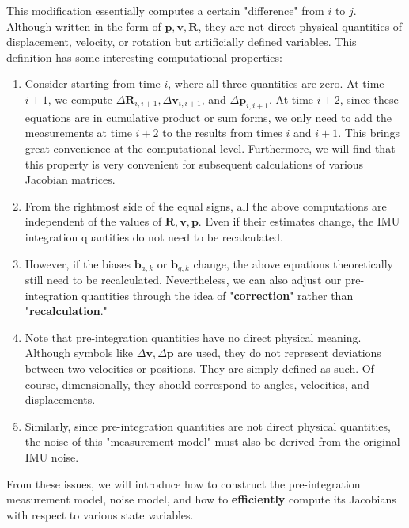 This modification essentially computes a certain "difference" from $i$ to $j$. Although written in the form of $\mathbf{p}, \mathbf{v}, \mathbf{R}$, they are not direct physical quantities of displacement, velocity, or rotation but artificially defined variables. This definition has some interesting computational properties:
\begin{enumerate}
	\item Consider starting from time $i$, where all three quantities are zero. At time $i+1$, we compute $\Delta \mathbf{R}_{i, i+1}, \Delta \mathbf{v}_{i, i+1}$, and $\Delta \mathbf{p}_{i,i+1}$. At time $i+2$, since these equations are in cumulative product or sum forms, we only need to add the measurements at time $i+2$ to the results from times $i$ and $i+1$. This brings great convenience at the computational level. Furthermore, we will find that this property is very convenient for subsequent calculations of various Jacobian matrices.
	\item From the rightmost side of the equal signs, all the above computations are independent of the values of $\mathbf{R}, \mathbf{v}, \mathbf{p}$. Even if their estimates change, the IMU integration quantities do not need to be recalculated.
	\item However, if the biases $\mathbf{b}_{a,k}$ or $\mathbf{b}_{g,k}$ change, the above equations theoretically still need to be recalculated. Nevertheless, we can also adjust our pre-integration quantities through the idea of "\textbf{correction}" rather than "\textbf{recalculation}."
	\item Note that pre-integration quantities have no direct physical meaning. Although symbols like $\Delta \mathbf{v}, \Delta \mathbf{p}$ are used, they do not represent deviations between two velocities or positions. They are simply defined as such. Of course, dimensionally, they should correspond to angles, velocities, and displacements.
	\item Similarly, since pre-integration quantities are not direct physical quantities, the noise of this "measurement model" must also be derived from the original IMU noise.
\end{enumerate}

From these issues, we will introduce how to construct the pre-integration measurement model, noise model, and how to \textbf{efficiently} compute its Jacobians with respect to various state variables.

